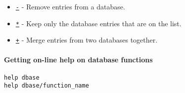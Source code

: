 \begin{itemize}
\itemsep1pt\parskip0pt
\item
  \href{dbase/dbminus}{\texttt{-}} - Remove entries from a database.
\item
  \href{dbase/dbmtimes}{\texttt{*}} - Keep only the database entries
  that are on the list.
\item
  \href{dbase/dbplus}{\texttt{+}} - Merge entries from two databases
  together.
\end{itemize}

\paragraph{Getting on-line help on database
functions}

\begin{verbatim}
help dbase
help dbase/function_name
\end{verbatim}



